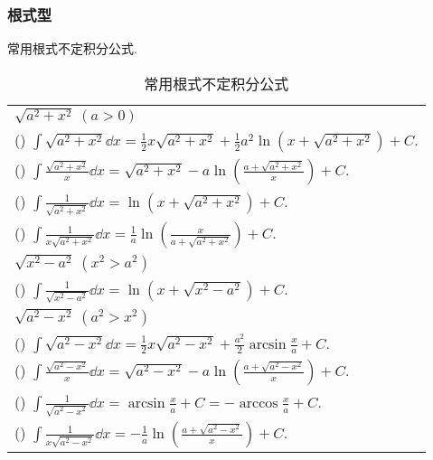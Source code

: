 \subsubsection{根式型}

常用根式不定积分公式.
\setcounter{magicrownumbers}{0}
\begin{table}[H]
    \centering
    \caption{常用根式不定积分公式}
    \begin{tabular}{l}
        $\sqrt{a^2+x^2}~  (a>0)$                                                                                                                                 \\
        (\rownumber{}) $\displaystyle\int \sqrt{a^{2}+x^{2}} \dd  x=\frac{1}{2} x \sqrt{a^{2}+x^{2}}+\frac{1}{2} a^{2} \ln \left(x+\sqrt{a^{2}+x^{2}}\right)+C.$ \\
        (\rownumber{}) $\displaystyle\int \frac{\sqrt{a^{2}+x^{2}}}{x} \dd  x=\sqrt{a^{2}+x^{2}}-a \ln \left(\frac{a+\sqrt{a^{2}+x^{2}}}{x}\right)+C.$           \\
        (\rownumber{}) $\displaystyle\int \frac{1}{\sqrt{a^{2}+x^{2}}} \dd  x=\ln \left(x+\sqrt{a^{2}+x^{2}}\right)+C .$                                         \\
        (\rownumber{}) $\displaystyle\int \frac{1}{x \sqrt{a^{2}+x^{2}}} \dd  x=\frac{1}{a} \ln \left(\frac{x}{a+\sqrt{a^{2}+x^{2}}}\right)+C .$                 \\
        \midrule
        $\sqrt{x^{2}-a^{2}} ~ \left(x^{2}>a^{2}\right)$                                                                                                          \\
        (\rownumber{}) $\displaystyle\int \frac{1}{\sqrt{x^{2}-a^{2}}} \dd  x=\ln \left(x+\sqrt{x^{2}-a^{2}}\right)+C.$                                          \\
        \midrule
        $\sqrt{a^{2}-x^{2}} ~ \left(a^{2}>x^{2}\right)$                                                                                                          \\
        (\rownumber{}) $\displaystyle\int \sqrt{a^{2}-x^{2}} \dd  x=\frac{1}{2} x \sqrt{a^{2}-x^{2}}+\frac{a^{2}}{2} \arcsin \frac{x}{a}+C.$                     \\
        (\rownumber{}) $\displaystyle\int \frac{\sqrt{a^{2}-x^{2}}}{x} \dd  x=\sqrt{a^{2}-x^{2}}-a \ln \left(\frac{a+\sqrt{a^{2}-x^{2}}}{x}\right)+C.$           \\
        (\rownumber{}) $\displaystyle\int \frac{1}{\sqrt{a^{2}-x^{2}}} \dd  x=\arcsin \frac{x}{a}+C=-\arccos \frac{x}{a}+C.$                                     \\
        (\rownumber{}) $\displaystyle\int \frac{1}{x \sqrt{a^{2}-x^{2}}} \dd  x=-\frac{1}{a} \ln \left(\frac{a+\sqrt{a^{2}-x^{2}}}{x}\right)+C.$                 \\
    \end{tabular}
\end{table}

